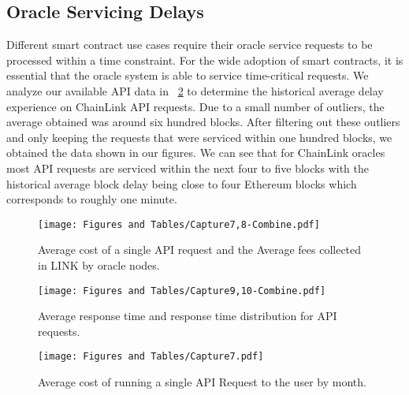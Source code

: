 \documentclass[runningheads]{llncs}
\begin{document}
\subsection{Oracle Servicing Delays}
Different smart contract use cases require their oracle service requests to be processed within a time constraint. For the wide adoption of smart contracts, it is essential that the oracle system is able to service time-critical requests. We analyze our available API data in \figurename~\ref{fig:responseTimesFig} to determine the historical average delay experience on ChainLink API requests. Due to a small number of outliers, the average obtained was around six hundred blocks. After filtering out these outliers and only keeping the requests that were serviced within one hundred blocks, we obtained the data shown in our figures. We can see that for ChainLink oracles most API requests are serviced within the next four to five blocks with the historical average block delay being close to four Ethereum blocks which corresponds to roughly one minute.





\begin{figure}
\begin{center}
\texttt{[image: Figures and Tables/Capture7,8-Combine.pdf]}
\caption{Average cost of a single API request and the Average fees collected in LINK by oracle nodes.}
\label{fig:CostsOracles}
\end{center}
\end{figure}
\vspace{-5pt}

\begin{figure}
\begin{center}
\texttt{[image: Figures and Tables/Capture9,10-Combine.pdf]}
\caption{Average response time and response time distribution for API requests.}
\label{fig:responseTimesFig}
\end{center}
\end{figure}
\vspace{-5pt}


\iffalse
\begin{figure}
\begin{center}
\texttt{[image: Figures and Tables/Capture7.pdf]}
\caption{Average cost of running a single API Request to the user by month.}
\label{fig:disAPIpermonth}
\end{center}
\end{figure}
\vspace{-5pt}
\end{document}
